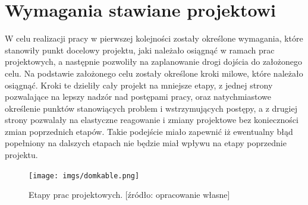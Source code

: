 \documentclass[a4paper,12pt,reqno]{article}
\begin{document}
\section{Wymagania stawiane projektowi}
W celu realizacji pracy w pierwszej kolejności zostały określone wymagania, które stanowiły punkt docelowy projektu, jaki należało osiągnąć w ramach prac projektowych, a następnie pozwoliły na zaplanowanie drogi dojścia do założonego celu.
\newline
Na podstawie założonego celu zostały określone kroki milowe, które należało osiągnąć. Kroki te dzieliły cały projekt na mniejsze etapy, z jednej strony pozwalające na lepszy nadzór nad postępami pracy, oraz natychmiastowe określenie punktów stanowiących problem i wstrzymujących postępy, a z drugiej strony pozwalały na elastyczne reagowanie i zmiany projektowe bez konieczności zmian poprzednich etapów.
\newline
Takie podejście miało zapewnić iż ewentualny błąd popełniony na dalszych etapach nie będzie miał wpływu na etapy poprzednie projektu.
\begin{figure}[!ht]%
\centering
\texttt{[image: imgs/domkable.png]}
\caption{Etapy prac projektowych. [źródło: opracowanie własne] \label{kable}}
\quad
\end{figure}
\end{document}
